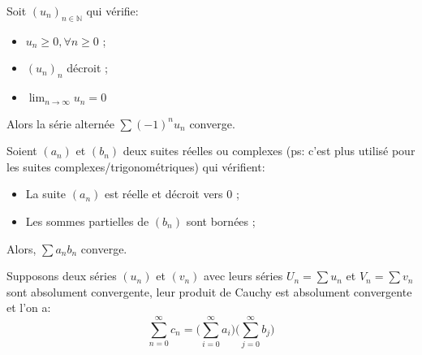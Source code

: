 \documentclass[12pt]{article}
\newenvironment{theorem}[2][Théorème]{\begin{trivlist}
\item[\hskip \labelsep {\bfseries #1}\hskip \labelsep {\bfseries #2.}]}{\end{trivlist}}
\newenvironment{definition}[2][Définition]{\begin{trivlist}
\item[\hskip \labelsep {\bfseries #1}\hskip \labelsep {\bfseries #2.}]}{\end{trivlist}}
\begin{document}
\bigskip
\begin{definition}{: Critère de Leibniz}
Soit $(u_n)_{n\in\mathbb{N}}$ qui vérifie:
\begin{itemize}
    \item $u_n \ge 0, \forall n\ge0$ ;
    \item $(u_n)_n$ décroit ;
    \item $\lim_{n\rightarrow\infty} u_n = 0$
\end{itemize}
Alors la série alternée $\sum (-1)^nu_n$ converge.
\end{definition}
\bigskip
\begin{definition}{: Critère d'Abel}
Soient $(a_n)$ et $(b_n)$ deux suites réelles ou complexes (ps: c'est plus utilisé pour les suites complexes/trigonométriques) qui vérifient:
\begin{itemize}
    \item La suite $(a_n)$ est réelle et décroit vers 0 ;
    \item Les sommes partielles de $(b_n)$ sont bornées ;
\end{itemize}
Alors, $\sum a_nb_n$ converge.
\end{definition}
\bigskip
\begin{theorem}{: Produit de Cauchy}
Supposons deux séries $(u_n) $ et $ (v_n)$ avec leurs séries $U_n = \sum u_n$ et $V_n = \sum v_n$ sont absolument convergente, leur produit de Cauchy est absolument convergente et l'on a:\\
\[
\sum_{n=0}^\infty c_n= \Bigg(\sum_{i=0}^\infty a_i\Bigg)\Bigg(\sum_{j=0}^\infty b_j\Bigg)
\]
\end{theorem}
\end{document}
